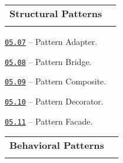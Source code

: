 \documentclass[a4paper,12pt]{article}
\renewenvironment{itemize}
{
    \begin{list}{\labelitemi}
    {
      \setlength{\topsep}{0pt}
      \setlength{\partopsep}{0pt}
      \setlength{\parskip}{0pt}
      \setlength{\itemsep}{0pt}
      \setlength{\parsep}{0pt}
      \setlength{\leftmargin}{14.5pt}
    }
}{\end{list}}
\begin{document}
\bigskip\medskip

\begin{tabular}{!{\vrule width 1pt}L{3.8cm}!{\vrule width 1pt}L{15.2cm}!{\vrule width 0pt}} 


\textbf{Structural Patterns} & \\


\end{tabular}

\medskip\smallskip

\begin{itemize}

    \item \href{https://github.com/i-s-m-mipt/Education/blob/master/projects/examples/source/05.07.cpp}{\texttt{05.07}} -- Pattern Adapter. 

    \smallskip

    \item \href{https://github.com/i-s-m-mipt/Education/blob/master/projects/examples/source/05.08.cpp}{\texttt{05.08}} -- Pattern Bridge. 

    \smallskip

    \item \href{https://github.com/i-s-m-mipt/Education/blob/master/projects/examples/source/05.09.cpp}{\texttt{05.09}} -- Pattern Composite. 

    \smallskip

    \item \href{https://github.com/i-s-m-mipt/Education/blob/master/projects/examples/source/05.10.cpp}{\texttt{05.10}} -- Pattern Decorator.

    \smallskip

    \item \href{https://github.com/i-s-m-mipt/Education/blob/master/projects/examples/source/05.11.cpp}{\texttt{05.11}} -- Pattern Facade.

\end{itemize}

\bigskip\medskip

\begin{tabular}{!{\vrule width 1pt}L{3.9cm}!{\vrule width 1pt}L{15.1cm}!{\vrule width 0pt}} 


\textbf{Behavioral Patterns} & \\


\end{tabular}
\end{document}
